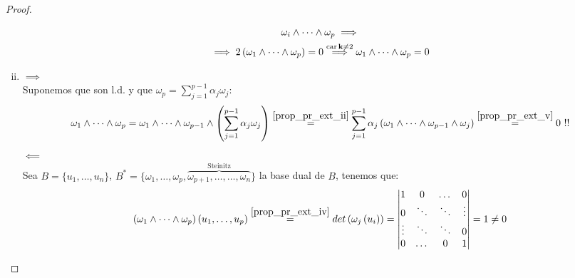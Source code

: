 \begin{proof}
\begin{enumerate}[i)]
\begin{gather*}
        \omega_i \wedge \dots \wedge \omega_p \implies \\
        \implies 2\left( \omega_1 \wedge \dots \wedge \omega_p \right) = 0
        \stackrel{\operatorname{car} \mathbf{k} \neq 2}{\implies} \omega_1 \wedge \dots \wedge \omega_p = 0
        \end{gather*}
        \item $\implies$ \\
        Suponemos que son l.d. y que $\omega_p = \sum_{j=1}^{p-1} \alpha_j \omega_j$:
        \[
        \omega_1 \wedge \dots \wedge \omega_p = \omega_1 \wedge \dots \wedge \omega_{p-1} \wedge \left(
        \sum_{j=1}^{p-1} \alpha_j \omega_j \right) \stackrel{\ref{prop_pr_ext_ii}}{=} \sum_{j=1}^{p-1}
        \alpha_j \left( \omega_1 \wedge \dots \wedge \omega_{p-1} \wedge \omega_j \right)
        \stackrel{\ref{prop_pr_ext_v}}{=} 0 \text{ } !!
        \]
        $\impliedby$ \\
        Sea $B=\{u_1,\dots,u_n\}$, $B^*=\{\omega_1, \dots, \omega_p,\overbrace{\omega_{p+1},\dots, \dots,
		    \omega_n}^{\text{Steinitz}} \}$ la base dual de $B$, tenemos que:
        \[
        \left( \omega_1 \wedge \dots \wedge \omega_p \right) \left( u_1,\dots,u_p \right) \stackrel{\ref{prop_pr_ext_iv}}{=}
        det\left( \omega_j \left(u_i \right) \right) = 
        \begin{vmatrix}
            1 & 0 & \dots & 0 \\
            0 & \ddots & \ddots & \vdots \\
            \vdots & \ddots & \ddots & 0 \\
            0 & \dots & 0 & 1
        \end{vmatrix}
        = 1 \neq 0
        \]
    \end{enumerate}
\end{proof}


